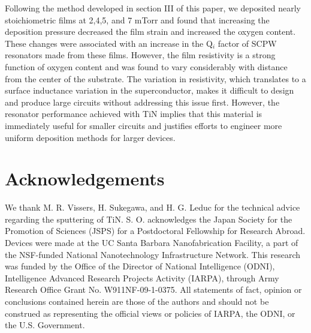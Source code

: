 Following the method developed in section III of this paper, we deposited nearly stoichiometric films at 2,4,5, and 7 mTorr and found that increasing the deposition pressure decreased the film strain and increased the oxygen content.  These changes were associated with an increase in the Q$_{i}$ factor of SCPW resonators made from these films.  However, the film resistivity is a strong function of oxygen content and was found to vary considerably with distance from the center of the substrate.  The variation in resistivity, which translates to a surface inductance variation in the superconductor, makes it difficult to design and produce large circuits without addressing this issue first.  However, the resonator performance achieved with TiN implies that this material is immediately useful for smaller circuits and justifies efforts to engineer more uniform deposition methods for larger devices.

\section*{Acknowledgements}%

We thank M. R. Vissers, H. Sukegawa, and H. G. Leduc for the technical advice regarding the sputtering of TiN. S. O. acknowledges the Japan Society for the Promotion of Sciences (JSPS) for a Postdoctoral Fellowship for Research Abroad.  Devices were made at the UC Santa Barbara Nanofabrication Facility, a part of the NSF-funded National Nanotechnology Infrastructure Network. This research was funded by the Office of the Director of National Intelligence (ODNI), Intelligence Advanced Research Projects Activity (IARPA), through Army Research Office Grant No. W911NF-09-1-0375. All statements of fact, opinion or conclusions contained herein are those of the authors and should not be construed as representing the official views or policies of IARPA, the ODNI, or the U.S. Government.


%